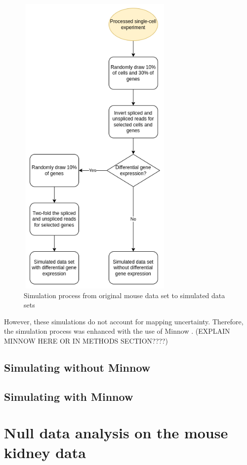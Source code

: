 \begin{figure}[!htb]
\begin{center}
\includegraphics[width=3in,height=6in]{figure/kidney_mouse/simulation_flow_chart.png}
\end{center}
\caption{Simulation process from original mouse data set to simulated data sets}
\label{fig:simulation_process}
\end{figure}
\FloatBarrier

However, these simulations do not account for mapping uncertainty. Therefore, the simulation process was enhanced with the use of Minnow \citep{minnow}. (EXPLAIN MINNOW HERE OR IN METHODS SECTION????)

\subsection{Simulating without Minnow}

\subsection{Simulating with Minnow}

\section{Null data analysis on the mouse kidney data}

